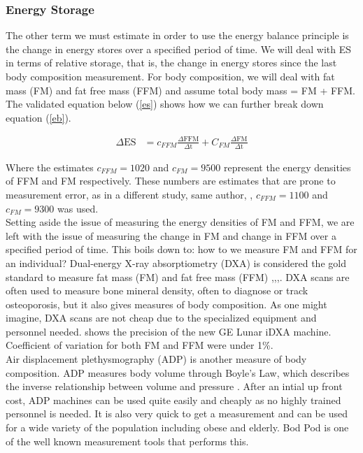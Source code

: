 \documentclass[11pt]{article}\usepackage[]{graphicx}\usepackage[]{color}
\begin{document}
\subsubsection{Energy Storage}

The other term we must estimate in order to use the energy balance principle is the change in energy stores over a specified period of time. We will deal with ES in terms of relative storage, that is, the change in energy stores since the last body composition measurement. For body composition, we will deal with fat mass (FM) and fat free mass (FFM) and assume total body mass = FM + FFM. The validated equation \cite{thomas12a}  below (\ref{es}) shows how we can further break down equation (\ref{eb}).

\begin{align}
	\Delta \text{ES} &= c_{FFM} \frac{\Delta \text{FFM}}{\Delta \text{t}} + C_{FM} \frac{\Delta \text{FM}}{\Delta \text{t}}
	\label{es}
\end{align}

Where the estimates $c_{FFM}=1020$ and $c_{FM}=9500$ represent the energy densities of FFM and FM respectively. These numbers are estimates that are prone to measurement error, as in a different study, same author,  \cite{thomas10}, $c_{FFM}=1100$ and $c_{FM}=9300$ was used. \\

Setting aside the issue of measuring the energy densities of FM and FFM, we are left with the issue of measuring the change in FM and change in FFM over a specified period of time. This boils down to: how to we measure FM and FFM for an individual? Dual-energy X-ray absorptiometry (DXA) is considered the gold standard to measure fat mass (FM) and fat free mass (FFM) \cite{thomas11a},\cite{thomas11},\cite{sanghvi15},\cite{gilmore}. DXA scans are often used to measure bone mineral density, often to diagnose or track osteoporosis, but it also gives measures of body composition. As one might imagine, DXA scans are not cheap due to the specialized equipment and personnel needed. \cite{hind11} shows the precision of the new GE Lunar iDXA machine. Coefficient of variation for both FM and FFM were under 1\%.  \\


Air displacement plethysmography (ADP) is another measure of body composition. ADP measures body volume through Boyle's Law, which describes the inverse relationship between volume and pressure \cite{baracos11}. After an intial up front cost, ADP machines can be used quite easily and cheaply as no highly trained personnel is needed. It is also very quick to get a measurement and can be used for a wide variety of the population including obese and elderly. Bod Pod is one of the well known measurement tools that performs this. \\
\end{document}
